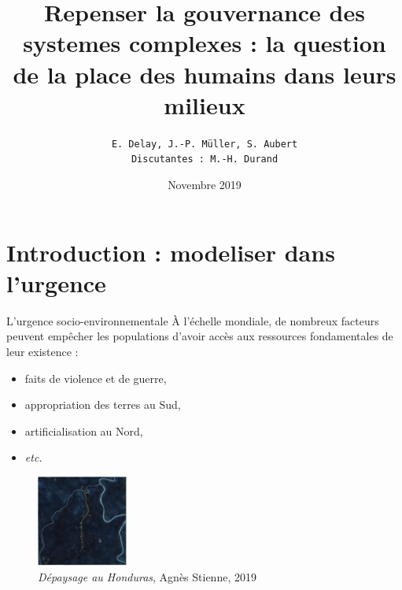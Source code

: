 \documentclass[newPxFont]{beamer}
\title{Repenser la gouvernance des systemes complexes : la question de la place des humains dans leurs milieux}
\date{Novembre 2019}
\author{\texttt{E. Delay, J.-P. Müller, S. Aubert \\ Discutantes : M.-H. Durand}}
\institute{CIRAD -- UPR GREEN}
\begin{document}
%
%


\maketitle


%
%


\section{Introduction : modeliser dans l'urgence}


\begin{frame}[c]{L'urgence socio-environnementale}
\vspace{-1cm}
À l'échelle mondiale, de nombreux facteurs peuvent empêcher les populations d'avoir accès aux ressources fondamentales de leur existence :
\begin{itemize}
  \item faits de violence et de guerre,
  \item appropriation des terres au Sud,
  \item artificialisation au Nord,
  \item \textit{etc.}
\end{itemize}
\begin{figure}
  \includegraphics[height=3cm]{img/Honduras.jpg}
  \caption{\textit{Dépaysage au Honduras}, Agnès Stienne, 2019}
\end{figure}
\end{frame}
\end{document}
